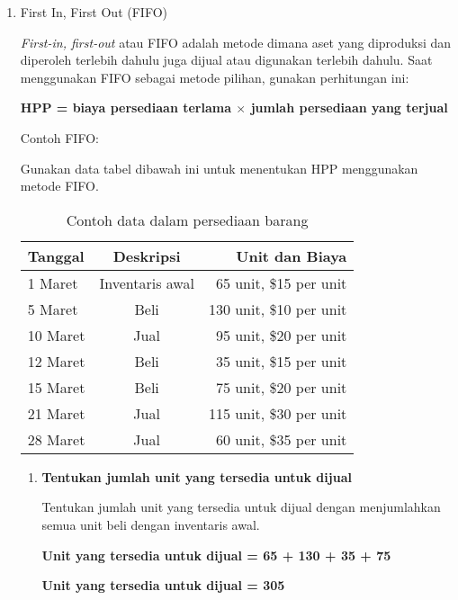 \begin{enumerate}
	\item First In, First Out (FIFO)
	
	\textit{First-in, first-out} atau FIFO adalah metode dimana aset yang diproduksi dan diperoleh terlebih dahulu juga dijual atau digunakan terlebih dahulu. Saat menggunakan FIFO sebagai metode pilihan, gunakan perhitungan ini:
	
	\textbf{HPP = biaya persediaan terlama $\times$ jumlah persediaan yang terjual}

	Contoh FIFO:

	Gunakan data tabel dibawah ini untuk menentukan HPP menggunakan metode FIFO.

	\begin{table}[h!]
		\begin{center}
		  \caption{Contoh data dalam persediaan barang}
		  \label{tab:table1}
		  \begin{tabular}{l|c|r} %
			\textbf{Tanggal} & \textbf{Deskripsi} & \textbf{Unit dan Biaya} \\
			\hline
			1 Maret & Inventaris awal & 65 unit, \${15} per unit\\
			5 Maret & Beli &  130 unit, \${10} per unit\\
			10 Maret & Jual &  95 unit, \${20} per unit\\
			12 Maret & Beli &  35 unit, \${15} per unit\\
			15 Maret & Beli &  75 unit, \${20} per unit\\
			21 Maret & Jual &  115 unit, \${30} per unit\\
			28 Maret & Jual &  60 unit, \${35} per unit\\
		  \end{tabular}
		\end{center}
	  \end{table}

	  \begin{enumerate}
		\item \textbf{Tentukan jumlah unit yang tersedia untuk dijual}
		
		Tentukan jumlah unit yang tersedia untuk dijual dengan menjumlahkan semua unit beli dengan inventaris awal.

		\textbf{Unit yang tersedia untuk dijual = 65 + 130 + 35 + 75}

		\textbf{Unit yang tersedia untuk dijual = 305}


\end{enumerate}
\end{enumerate}
